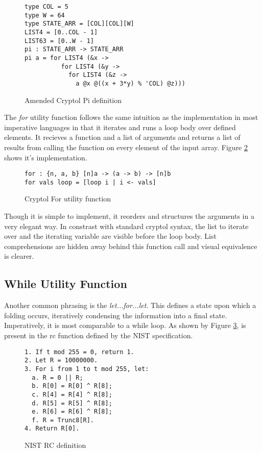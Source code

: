 \begin{figure}[h]
  \centering
\begin{lstlisting}[language=Cryptol]
type COL = 5 
type W = 64
type STATE_ARR = [COL][COL][W]
LIST4 = [0..COL - 1]
LIST63 = [0..W - 1]
pi : STATE_ARR -> STATE_ARR
pi a = for LIST4 (&x ->
          for LIST4 (&y -> 
            for LIST4 (&z -> 
              a @x @((x + 3*y) % 'COL) @z)))
\end{lstlisting}
\caption{Amended Cryptol Pi definition}
\label{fig:cryptolAmendedPi}
\end{figure}

The \emph{for} utility function follows the same intuition as the implementation in most 
imperative languages in that it iterates and runs a loop body over defined elements. 
It recieves a function and a list of arguments and returns a list of results from calling the function 
on every element of the input array. Figure \ref{fig:cryptolFor} shows it's implementation.

\begin{figure}[h]
  \centering
\begin{lstlisting}[language=Cryptol]
for : {n, a, b} [n]a -> (a -> b) -> [n]b
for vals loop = [loop i | i <- vals]
\end{lstlisting}
\caption{Cryptol For utility function}
\label{fig:cryptolFor}
\end{figure}

Though it is simple to implement, it reorders and structures the arguments in a very elegant way.
In constrast with standard cryptol syntax, the list to iterate over and the iterating 
variable are visible before the loop body. List comprehensions are hidden away behind this 
function call and visual equivalence is clearer.

\subsection{While Utility Function}
Another common phrasing is the \emph{let...for...let}. This defines a state upon which a folding 
occurs, iteratively condensing the information into a final state. Imperatively, it is most 
comparable to a while loop. As shown by Figure \ref{fig:nistRC}, is present in the rc function 
defined by the NIST specification.

\begin{figure}[h]
  \centering
\begin{lstlisting}[basewidth = {.5em},basicstyle={\scriptsize}]
1. If t mod 255 = 0, return 1.
2. Let R = 10000000.
3. For i from 1 to t mod 255, let:
  a. R = 0 || R;
  b. R[0] = R[0] ^ R[8];
  c. R[4] = R[4] ^ R[8];
  d. R[5] = R[5] ^ R[8];
  e. R[6] = R[6] ^ R[8];
  f. R = Trunc8[R].
4. Return R[0].
\end{lstlisting}
\caption{NIST RC definition}
\label{fig:nistRC}
\end{figure}

